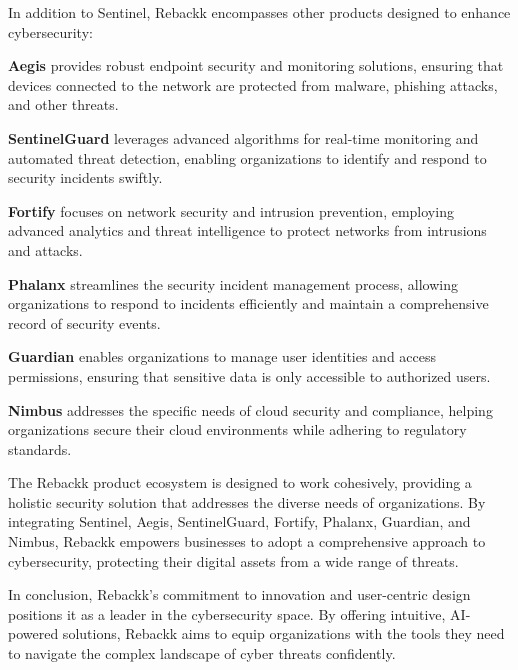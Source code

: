 In addition to Sentinel, Rebackk encompasses other products designed to enhance cybersecurity:

\textbf{Aegis} provides robust endpoint security and monitoring solutions, ensuring that devices connected to the network are protected from malware, phishing attacks, and other threats.

\textbf{SentinelGuard} leverages advanced algorithms for real-time monitoring and automated threat detection, enabling organizations to identify and respond to security incidents swiftly.

\textbf{Fortify} focuses on network security and intrusion prevention, employing advanced analytics and threat intelligence to protect networks from intrusions and attacks.

\textbf{Phalanx} streamlines the security incident management process, allowing organizations to respond to incidents efficiently and maintain a comprehensive record of security events.

\textbf{Guardian} enables organizations to manage user identities and access permissions, ensuring that sensitive data is only accessible to authorized users.

\textbf{Nimbus} addresses the specific needs of cloud security and compliance, helping organizations secure their cloud environments while adhering to regulatory standards.

The Rebackk product ecosystem is designed to work cohesively, providing a holistic security solution that addresses the diverse needs of organizations. By integrating Sentinel, Aegis, SentinelGuard, Fortify, Phalanx, Guardian, and Nimbus, Rebackk empowers businesses to adopt a comprehensive approach to cybersecurity, protecting their digital assets from a wide range of threats.

In conclusion, Rebackk’s commitment to innovation and user-centric design positions it as a leader in the cybersecurity space. By offering intuitive, AI-powered solutions, Rebackk aims to equip organizations with the tools they need to navigate the complex landscape of cyber threats confidently.